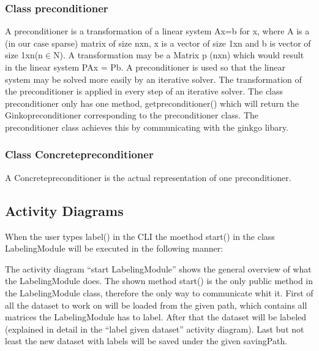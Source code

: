 \documentclass[parskip=full]{scrartcl}
\begin{document}
\subsubsection{Class \gls{preconditioner}}
A \gls{preconditioner} is a transformation of a linear system Ax=b for x, where A is a (in our case sparse) matrix of size nxn, x is a vector of size 1xn and b is vector of size 1xn(n$\in$N).
A transformation may be a Matrix p (nxn) which would result in the linear system PAx = Pb.
A \gls{preconditioner} is used so that the linear system may be solved more easily by an \gls{iterative solver}.
The transformation of the \gls{preconditioner} is applied in every step of an \gls{iterative solver}. \newline\newline
The class \gls{preconditioner} only has one method, get\gls{preconditioner}() which will return the Ginko\gls{preconditioner} corresponding to the \gls{preconditioner} class.
The \gls{preconditioner} class achieves this by communicating with the ginkgo libary.

\subsubsection{Class Concrete\gls{preconditioner}}
A Concrete\gls{preconditioner} is the actual representation of one \gls{preconditioner}.

\newpage
\subsection{Activity Diagrams}
When the user types label() in the CLI the moethod start() in the class LabelingModule will be executed in the following manner:

\begin{figure}[h]
\begin{center}

\label{Activity Diagrams}
\end{center}
\end{figure}
\newpage


The activity diagram ``start LabelingModule'' shows the general overview of what the LabelingModule does.
The shown method start() is the only public method in the LabelingModule class, therefore the only way to communicate whit it.
First of all the dataset to work on will be loaded from the given path, which contains all matrices the LabelingModule has to label.
After that the dataset will be labeled (explained in detail in the ``label given dataset'' activity diagram).
Last but not least the new dataset with \glspl{label} will be saved under the given savingPath.
\end{document}
